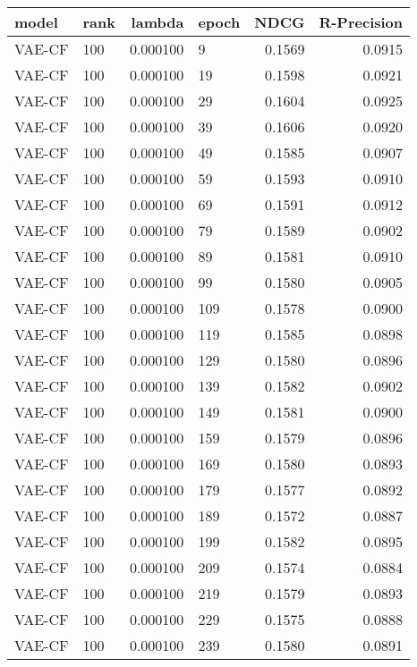 \begin{tabular}{llrlrr}
\toprule
   model & rank &    lambda & epoch &    NDCG &  R-Precision \\
\midrule
  VAE-CF &  100 &  0.000100 &     9 &  0.1569 &       0.0915 \\
  VAE-CF &  100 &  0.000100 &    19 &  0.1598 &       0.0921 \\
  VAE-CF &  100 &  0.000100 &    29 &  0.1604 &       0.0925 \\
  VAE-CF &  100 &  0.000100 &    39 &  0.1606 &       0.0920 \\
  VAE-CF &  100 &  0.000100 &    49 &  0.1585 &       0.0907 \\
  VAE-CF &  100 &  0.000100 &    59 &  0.1593 &       0.0910 \\
  VAE-CF &  100 &  0.000100 &    69 &  0.1591 &       0.0912 \\
  VAE-CF &  100 &  0.000100 &    79 &  0.1589 &       0.0902 \\
  VAE-CF &  100 &  0.000100 &    89 &  0.1581 &       0.0910 \\
  VAE-CF &  100 &  0.000100 &    99 &  0.1580 &       0.0905 \\
  VAE-CF &  100 &  0.000100 &   109 &  0.1578 &       0.0900 \\
  VAE-CF &  100 &  0.000100 &   119 &  0.1585 &       0.0898 \\
  VAE-CF &  100 &  0.000100 &   129 &  0.1580 &       0.0896 \\
  VAE-CF &  100 &  0.000100 &   139 &  0.1582 &       0.0902 \\
  VAE-CF &  100 &  0.000100 &   149 &  0.1581 &       0.0900 \\
  VAE-CF &  100 &  0.000100 &   159 &  0.1579 &       0.0896 \\
  VAE-CF &  100 &  0.000100 &   169 &  0.1580 &       0.0893 \\
  VAE-CF &  100 &  0.000100 &   179 &  0.1577 &       0.0892 \\
  VAE-CF &  100 &  0.000100 &   189 &  0.1572 &       0.0887 \\
  VAE-CF &  100 &  0.000100 &   199 &  0.1582 &       0.0895 \\
  VAE-CF &  100 &  0.000100 &   209 &  0.1574 &       0.0884 \\
  VAE-CF &  100 &  0.000100 &   219 &  0.1579 &       0.0893 \\
  VAE-CF &  100 &  0.000100 &   229 &  0.1575 &       0.0888 \\
  VAE-CF &  100 &  0.000100 &   239 &  0.1580 &       0.0891 \\

\end{tabular}

